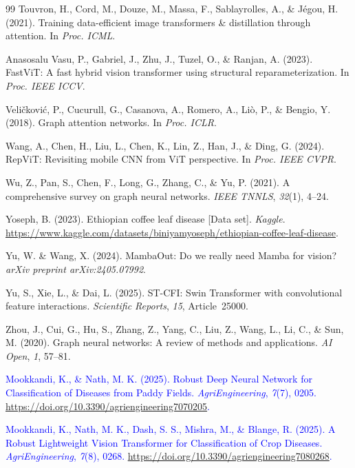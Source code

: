 \documentclass[]{interact}
\theoremstyle{plain}
\theoremstyle{definition}
\theoremstyle{remark}
\begin{document}
\begin{thebibliography}{99}
Touvron, H., Cord, M., Douze, M., Massa, F., Sablayrolles, A., \& J\'{e}gou, H. (2021). Training data-efficient image transformers \& distillation through attention. In \emph{Proc. ICML}.

Anasosalu Vasu, P., Gabriel, J., Zhu, J., Tuzel, O., \& Ranjan, A. (2023). FastViT: A fast hybrid vision transformer using structural reparameterization. In \emph{Proc. IEEE ICCV}.

Veli\v{c}kovi\'{c}, P., Cucurull, G., Casanova, A., Romero, A., Li\`{o}, P., \& Bengio, Y. (2018). Graph attention networks. In \emph{Proc. ICLR}.

Wang, A., Chen, H., Liu, L., Chen, K., Lin, Z., Han, J., \& Ding, G. (2024). RepViT: Revisiting mobile CNN from ViT perspective. In \emph{Proc. IEEE CVPR}.

Wu, Z., Pan, S., Chen, F., Long, G., Zhang, C., \& Yu, P. (2021). A comprehensive survey on graph neural networks. \emph{IEEE TNNLS}, \emph{32}(1), 4--24.

Yoseph, B. (2023). Ethiopian coffee leaf disease [Data set]. \emph{Kaggle}. \url{https://www.kaggle.com/datasets/biniyamyoseph/ethiopian-coffee-leaf-disease}.

Yu, W. \& Wang, X. (2024). MambaOut: Do we really need Mamba for vision? \emph{arXiv preprint arXiv:2405.07992}.

Yu, S., Xie, L., \& Dai, L. (2025). ST-CFI: Swin Transformer with convolutional feature interactions. \emph{Scientific Reports}, \emph{15}, Article~25000.

Zhou, J., Cui, G., Hu, S., Zhang, Z., Yang, C., Liu, Z., Wang, L., Li, C., \& Sun, M. (2020). Graph neural networks: A review of methods and applications. \emph{AI Open}, \emph{1}, 57--81.

\textcolor{blue}{Mookkandi, K., \& Nath, M. K. (2025). Robust Deep Neural Network for Classification of Diseases from Paddy Fields. \emph{AgriEngineering}, \emph{7}(7), 0205. \url{https://doi.org/10.3390/agriengineering7070205}.}

\textcolor{blue}{Mookkandi, K., Nath, M. K., Dash, S. S., Mishra, M., \& Blange, R. (2025). A Robust Lightweight Vision Transformer for Classification of Crop Diseases. \emph{AgriEngineering}, \emph{7}(8), 0268. \url{https://doi.org/10.3390/agriengineering7080268}.}


\end{thebibliography}
\end{document}
